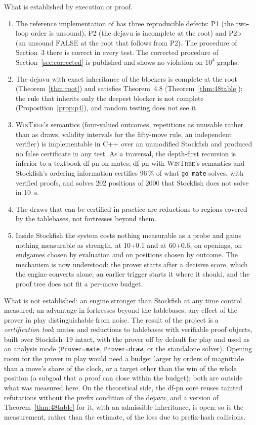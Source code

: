 \documentclass{article}
\theoremstyle{plain}
\theoremstyle{definition}
\theoremstyle{remark}
\newcommand{\FALSE}{\ensuremath{\mathrm{FALSE}}}
\newcommand{\code}[1]{\texttt{#1}}
\newcommand{\WT}{\textsc{WinTree}}
\begin{document}
What is established by execution or proof.
\begin{enumerate}[leftmargin=*]
\item The reference implementation of \cite{romano2026} has three reproducible defects: P1 (the two-loop order is unsound), P2 (the dejavu is incomplete at the root) and P2b (an unsound \FALSE{} at the root that follows from P2). The procedure of Section~3 there is correct in every test. The corrected procedure of Section~\ref{sec:corrected} is published and shows no violation on $10^4$ graphs.
\item The dejavu with exact inheritance of the blockers is complete at the root (Theorem~\ref{thm:root}) and satisfies Theorem~4.8 (Theorem~\ref{thm:48table}); the rule that inherits only the deepest blocker is not complete (Proposition~\ref{prop:p4}), and random testing does not see it.
\item \WT{}'s semantics (four-valued outcomes, repetitions as unusable rather than as draws, validity intervals for the fifty-move rule, an independent verifier) is implementable in C++ over an unmodified Stockfish and produced no false certificate in any test. As a traversal, the depth-first recursion is inferior to a textbook df-pn on mates; df-pn with \WT{}'s semantics and Stockfish's ordering information certifies 96\,\% of what \code{go mate} solves, with verified proofs, and solves 202 positions of 2000 that Stockfish does not solve in 10~s.
\item The draws that can be certified in practice are reductions to regions covered by the tablebases, not fortresses beyond them.
\item Inside Stockfish the system costs nothing measurable as a probe and gains nothing measurable as strength, at 10+0.1 and at 60+0.6, on openings, on endgames chosen by evaluation and on positions chosen by outcome. The mechanism is now understood: the prover starts after a decisive score, which the engine converts alone; an earlier trigger starts it where it should, and the proof tree does not fit a per-move budget.
\end{enumerate}

What is not established: an engine stronger than Stockfish at any time control measured; an advantage in fortresses beyond the tablebases; any effect of the prover in play distinguishable from noise. The result of the project is a \emph{certification tool}: mates and reductions to tablebases with verifiable proof objects, built over Stockfish~19 intact, with the prover off by default for play and used as an analysis mode (\code{Prover=mate}, \code{Prover=draw}, or the standalone solver). Opening room for the prover in play would need a budget larger by orders of magnitude than a move's share of the clock, or a target other than the win of the whole position (a subgoal that a proof can close within the budget); both are outside what was measured here. On the theoretical side, the df-pn core reuses tainted refutations without the prefix condition of the dejavu, and a version of Theorem~\ref{thm:48table} for it, with an admissible inheritance, is open; so is the measurement, rather than the estimate, of the loss due to prefix-hash collisions.
\end{document}
